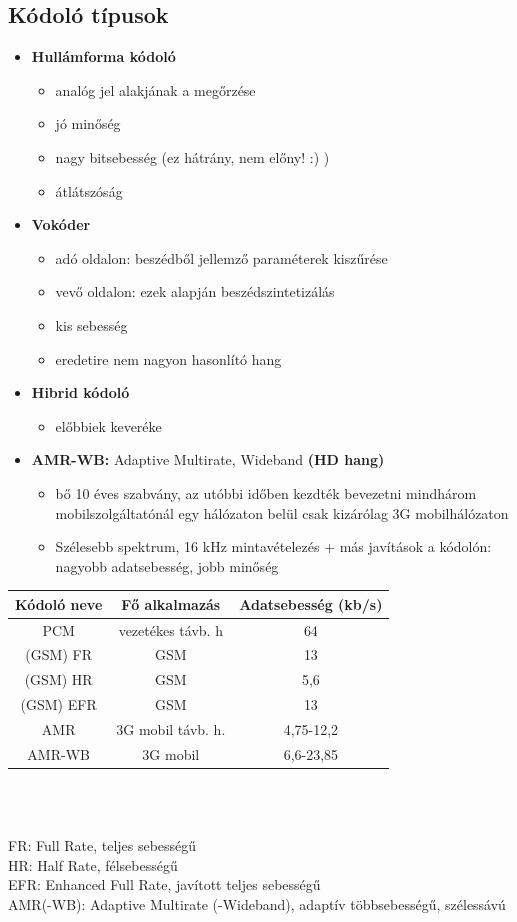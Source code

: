\documentclass[10pt,a4paper]{article}
\begin{document}
\subsection{Kódoló típusok}
\begin{itemize}
	\item  \textbf{Hullámforma kódoló}
\begin{itemize}
	\item analóg jel alakjának a megőrzése
	\item jó minőség
	\item nagy bitsebesség (ez hátrány, nem előny! :) )
	\item átlátszóság
\end{itemize}
	\item \textbf{Vokóder}
\begin{itemize}
	\item adó oldalon: beszédből jellemző paraméterek kiszűrése
	\item vevő oldalon: ezek alapján beszédszintetizálás
	\item kis sebesség
	\item eredetire nem nagyon hasonlító hang
\end{itemize}
	\item \textbf{Hibrid kódoló}
	\begin{itemize}
	\item előbbiek keveréke
\end{itemize}
\item\textbf{ AMR-WB:} Adaptive Multirate, Wideband \textbf{(HD hang)}
\begin{itemize}
\item bő 10 éves szabvány, az utóbbi időben kezdték bevezetni
\subitem mindhárom mobilszolgáltatónál
\subitem egy hálózaton belül csak
\subitem kizárólag 3G mobilhálózaton
\item Szélesebb spektrum, 16 kHz mintavételezés + más javítások a
kódolón: nagyobb adatsebesség, jobb minőség
\end{itemize}
\end{itemize}
\begin{tabular}{|c|c|c|}
	\hline 
	Kódoló neve & Fő
	alkalmazás & Adatsebesség
	(kb/s) \\ 
	\hline 
	PCM & vezetékes
	távb. h & 64 \\ 
	\hline 
	(GSM) FR & GSM & 13 \\ 
	\hline 
	(GSM) HR & GSM & 5,6 \\ 
	\hline 
	(GSM) EFR & GSM & 13 \\ 
	\hline 
	AMR & 3G mobil távb. h. & 4,75-12,2 \\ 
	\hline 
	AMR-WB & 3G mobil & 6,6-23,85 \\ 
	\hline 
\end{tabular} 
\\
{\raggedright \small\\
FR: Full Rate, teljes sebességű\\
HR: Half Rate, félsebességű\\
EFR: Enhanced Full Rate, javított teljes sebességű\\
AMR(-WB): Adaptive Multirate (-Wideband), adaptív többsebességű, szélessávú \par}
\end{document}
